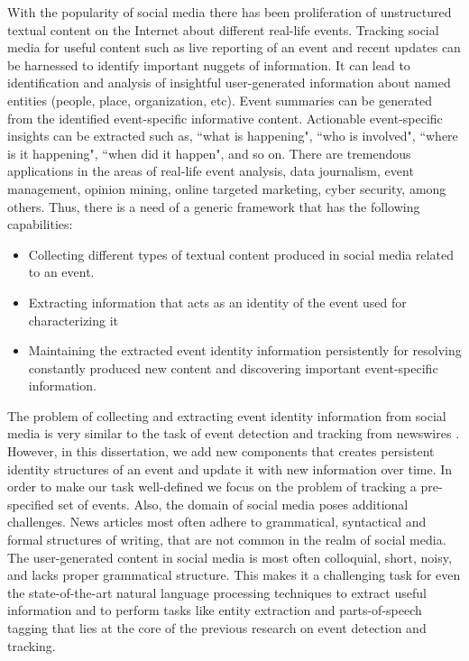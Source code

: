 With the popularity of social media there has been proliferation of unstructured textual content on the Internet about different real-life events. Tracking social media for useful content such as live reporting of an event and recent updates can be harnessed to identify important nuggets of information. It can lead to identification and analysis of insightful user-generated information about named entities (people, place, organization, etc). Event summaries can be generated from the identified event-specific informative content. Actionable event-specific insights can be extracted such as, ``what is happening", ``who is involved", ``where is it happening", ``when did it happen", and so on. There are tremendous applications in the areas of real-life event analysis, data journalism, event management, opinion mining, online targeted marketing, cyber security, among others. Thus, there is a need of a generic framework that has the following capabilities:
\begin{itemize}
\item Collecting different types of textual content produced in social media related to an event.
\item Extracting information that acts as an identity of the event used for characterizing it
\item Maintaining the extracted event identity information persistently for resolving constantly produced new content and discovering important event-specific information. 
\end{itemize}


The problem of collecting and extracting event identity information from social media is very similar to the task of event detection and tracking from newswires \cite{allan1998line,kumaran2004text}. However, in this dissertation, we add new components that creates persistent identity structures of an event and update it with new information over time. In order to make our task well-defined we focus on the problem of tracking a pre-specified set of events. Also, the domain of social media poses additional challenges. News articles most often adhere to grammatical, syntactical and formal structures of writing, that are not common in the realm of social media. The user-generated content in social media is most often colloquial, short, noisy, and lacks proper grammatical structure. This makes it a challenging task for even the state-of-the-art natural language processing techniques to extract useful information and to perform tasks like entity extraction and parts-of-speech tagging that lies at the core of the previous research on event detection and tracking.

